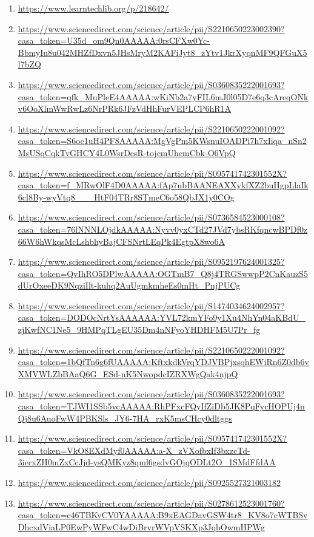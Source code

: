\documentclass[a4paper,12pt]{article}
\begin{document}
\begin{enumerate}
  \item \url{https://www.learntechlib.org/p/218642/}
  \item \url{https://www.sciencedirect.com/science/article/pii/S2210650223002390?casa_token=U35d_om9Qn0AAAAA:0rsCFXw0Yc-BbmyIu8u042MHZfDxvn5JHsMryM2KAFiJyt8_zYtv1JkrXyqnMF9QFGuX5l7bZQ}
  \item \url{https://www.sciencedirect.com/science/article/pii/S0360835222001693?casa_token=qfk_MuPleE4AAAAA:wKiNb2a7yFIL6mJ0l05D7e6q3cAreqONkv6OoXlmWwRwLz6NrPRk6JFzVdHhFurVEPLCP6hR1A}
  \item \url{https://www.sciencedirect.com/science/article/pii/S2210650222001092?casa_token=S6oc1uH4PF8AAAAA:MgVgPm5KWsnuIOADPi7h7xIiqa_nSn2MsUSqCqkTvGHCY4L0WsrDesR-tojcmUhemCbk-O6VpQ}
  \item \url{https://www.sciencedirect.com/science/article/pii/S095741742301552X?casa_token=f_MRwOlF4D0AAAAA:fAp7ubBAANEAXXykfXZ2buHgpLlaIk6cl8By-wyVtq8___HtF04TRr8STmeC6o58QbJX1y0COg}
  \item \url{https://www.sciencedirect.com/science/article/pii/S0736584523000108?casa_token=76lNNNLOjdkAAAAA:Nyvv0yxCTd27JVd7ybsRKfqncwBPDf0z66W6hWkqsMcLshbhyBajCFSNrtLEqPk4EgtpX8wo6A}
  \item \url{https://www.sciencedirect.com/science/article/pii/S0952197624001325?casa_token=QvIhRO5DPlwAAAAA:OGTmB7_Q8j4TRGSwwpP2CnKauzS5dUrOxeeDK9NqziIlt-kuhq2AuUgmkmheEs0mHt_PnjPUCg}
  \item \url{https://www.sciencedirect.com/science/article/pii/S1474034624002957?casa_token=DODOcNrtYsAAAAAA:YVL72kmYFo9y1Xu4NhYn04aKBdU_zjKwfNC1Ne5_9HMPqTLgEU35Dm4nNFyoYHDHFM5U7Pr_fg}
  \item \url{https://www.sciencedirect.com/science/article/pii/S2210650222001092?casa_token=1bQfTn6g6fUAAAAA:KftxkdkVrqYDJVBPjxsqhEWiRn6Z0db6vXMVWLZbBAaQ6G_ESd-nK5NwopdcIZRXWgQak4njpQ}
  \item \url{https://www.sciencedirect.com/science/article/pii/S0360835222001693?casa_token=TJWI1SSb5vcAAAAA:RhPFxcFQyIfZiDb5JK8PqFycHOPUj4nQj8u6AuoFwW4PBKSls_JY6-7HA_rxK5msCHcy0dltggs}
  \item \url{https://www.sciencedirect.com/science/article/pii/S095741742301552X?casa_token=VkO8EXdMyf0AAAAA:a-X_zVXofbxIf3bxzcTd-3ierxZH0mZxCcJjd-ysQMKyz8qml6gsdvGOjqODLt2O_1SMdFfdAA}
  \item \url{https://www.sciencedirect.com/science/article/pii/S0925527321003182}
  \item \url{https://www.sciencedirect.com/science/article/pii/S0278612523001760?casa_token=c46TBKvCV0YAAAAA:B9xEAGDavGSW4tr8_KV8o7eWTBSvDhcxdViaLP0EwPyWFwC4wDiBrvrWVpVSKXp3JqbOwmHPWg}

\end{enumerate}
\end{document}
